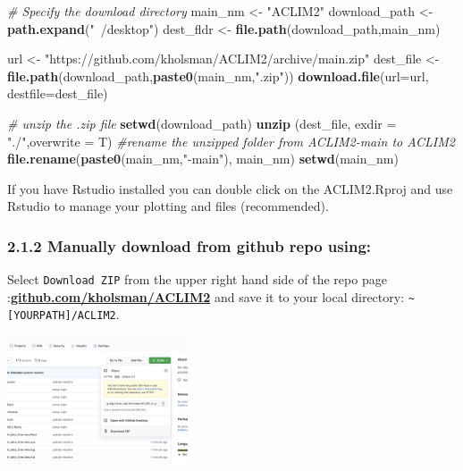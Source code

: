 \documentclass[
]{article}
\newenvironment{Shaded}{\begin{snugshade}}{\end{snugshade}}
\newcommand{\CommentTok}[1]{\textcolor[rgb]{0.56,0.35,0.01}{\textit{#1}}}
\newcommand{\DataTypeTok}[1]{\textcolor[rgb]{0.13,0.29,0.53}{#1}}
\newcommand{\KeywordTok}[1]{\textcolor[rgb]{0.13,0.29,0.53}{\textbf{#1}}}
\newcommand{\NormalTok}[1]{#1}
\newcommand{\StringTok}[1]{\textcolor[rgb]{0.31,0.60,0.02}{#1}}
\begin{document}
\begin{Shaded}
\begin{Highlighting}[]
    \CommentTok{# Specify the download directory}
\NormalTok{    main_nm       <-}\StringTok{ "ACLIM2"}
\NormalTok{    download_path <-}\StringTok{ }\KeywordTok{path.expand}\NormalTok{(}\StringTok{"~/desktop"}\NormalTok{)}
\NormalTok{    dest_fldr     <-}\StringTok{ }\KeywordTok{file.path}\NormalTok{(download_path,main_nm)}
    
\NormalTok{    url           <-}\StringTok{ "https://github.com/kholsman/ACLIM2/archive/main.zip"}
\NormalTok{    dest_file     <-}\StringTok{ }\KeywordTok{file.path}\NormalTok{(download_path,}\KeywordTok{paste0}\NormalTok{(main_nm,}\StringTok{".zip"}\NormalTok{))}
    \KeywordTok{download.file}\NormalTok{(}\DataTypeTok{url=}\NormalTok{url, }\DataTypeTok{destfile=}\NormalTok{dest_file)}
    
    \CommentTok{# unzip the .zip file}
    \KeywordTok{setwd}\NormalTok{(download_path)}
    \KeywordTok{unzip}\NormalTok{ (dest_file, }\DataTypeTok{exdir =} \StringTok{"./"}\NormalTok{,}\DataTypeTok{overwrite =}\NormalTok{ T)}
    \CommentTok{#rename the unzipped folder from ACLIM2-main to ACLIM2}
    \KeywordTok{file.rename}\NormalTok{(}\KeywordTok{paste0}\NormalTok{(main_nm,}\StringTok{"-main"}\NormalTok{), main_nm)}
    \KeywordTok{setwd}\NormalTok{(main_nm)}
\end{Highlighting}
\end{Shaded}

If you have Rstudio installed you can double click on the ACLIM2.Rproj
and use Rstudio to manage your plotting and files (recommended).

\hypertarget{manually-download-from-github-repo-using}{%
\subsubsection{2.1.2 Manually download from github repo
using:}\label{manually-download-from-github-repo-using}}

Select \texttt{Download\ ZIP} from the upper right hand side of the repo
page
:\href{https://github.com/kholsman/ACLIM2}{\textbf{github.com/kholsman/ACLIM2}}
and save it to your local directory:
\texttt{\textasciitilde{}{[}YOURPATH{]}/ACLIM2}.

\includegraphics[width=0.4\textwidth,height=\textheight]{Figs/clone.jpg}
\end{document}
